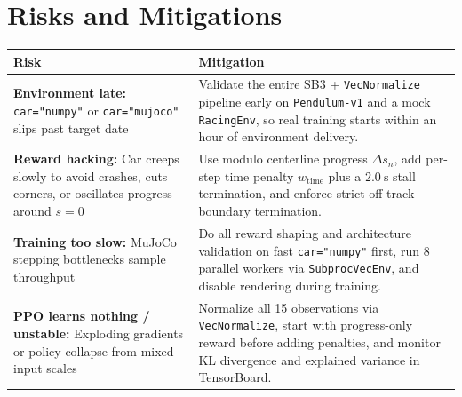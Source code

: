 \documentclass[11pt]{article}
\begin{document}
\section{Risks and Mitigations}
\begin{center}
\begin{tabular}{p{}p{}}
\toprule
Risk & Mitigation\\
\midrule
\textbf{Environment late:} \texttt{car="numpy"} or \texttt{car="mujoco"} slips past target date & Validate the entire SB3 + \texttt{VecNormalize} pipeline early on \texttt{Pendulum-v1} and a mock \texttt{RacingEnv}, so real training starts within an hour of environment delivery.\\
\textbf{Reward hacking:} Car creeps slowly to avoid crashes, cuts corners, or oscillates progress around $s=0$ & Use modulo centerline progress $\Delta s_n$, add per-step time penalty $w_{\text{time}}$ plus a $2.0~\text{s}$ stall termination, and enforce strict off-track boundary termination.\\
\textbf{Training too slow:} MuJoCo stepping bottlenecks sample throughput & Do all reward shaping and architecture validation on fast \texttt{car="numpy"} first, run $8$ parallel workers via \texttt{SubprocVecEnv}, and disable rendering during training.\\
\textbf{PPO learns nothing / unstable:} Exploding gradients or policy collapse from mixed input scales & Normalize all 15 observations via \texttt{VecNormalize}, start with progress-only reward before adding penalties, and monitor KL divergence and explained variance in TensorBoard.\\
\bottomrule
\end{tabular}
\end{center}
\end{document}
